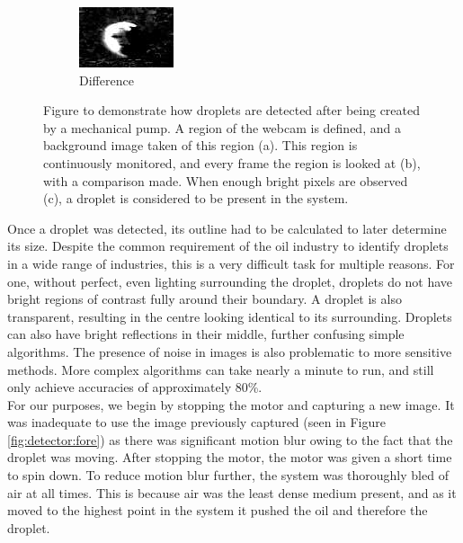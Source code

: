 \documentclass{physics_article_B}
\begin{document}
\begin{figure}[H]
\begin{subfigure}[b]{0.3\textwidth}
        \includegraphics[width=\textwidth]{Figures/DropFinder3.eps}
        \caption{Difference}
        \label{fig:detector:diff}
    \end{subfigure}
    \caption{Figure to demonstrate how droplets are detected after being created by a mechanical pump. A region of the webcam is defined, and a background image taken of this region (a). This region is continuously monitored, and every frame the region is looked at (b), with a comparison made. When enough bright pixels are observed (c), a droplet is considered to be present in the system.}\label{fig:detector}
\end{figure}

Once a droplet was detected, its outline had to be calculated to later determine its size. Despite the common requirement of the oil industry to identify droplets in a wide range of industries\cite{bubblegeneral}, this is a very difficult task for multiple reasons. For one, without perfect, even lighting surrounding the droplet, droplets do not have bright regions of contrast fully around their boundary. A droplet is also transparent, resulting in the centre looking identical to its surrounding. Droplets can also have bright reflections in their middle, further confusing simple algorithms\cite{bubble1}. The presence of noise in images is also problematic to more sensitive methods. More complex algorithms can take nearly a minute to run\cite{bubble2}, and still only achieve accuracies of approximately 80\%\cite{bubble2}.\\

For our purposes, we begin by stopping the motor and capturing a new image. It was inadequate to use the image previously captured (seen in Figure \ref{fig:detector:fore}) as there was significant motion blur owing to the fact that the droplet was moving. After stopping the motor, the motor was given a short time to spin down. To reduce motion blur further, the system was thoroughly bled of air at all times. This is because air was the least dense medium present, and as it moved to the highest point in the system it pushed the oil and therefore the droplet.\\ 
\end{document}
